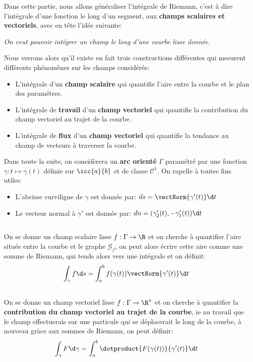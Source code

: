 Dans cette partie, nous allons généraliser l'intégrale de Riemann, c'est à dire l'intégrale d'une fonction le long d'un segment, aux \textbf{champs scalaires et vectoriels}, avec en tête l'idée suivante:
\begin{center}
   \textit{On veut pouvoir intégrer un champ le long d'une courbe lisse donnée.}
\end{center}
Nous verrons alors qu'il existe en fait trois constructions différentes qui mesurent différents phénomênes sur les champs considérés:
\begin{itemize}
   \item L'intégrale d'un \textbf{champ scalaire} qui quantifie l'aire entre la courbe et le plan des paramétres.
   \item L'intégrale de \textbf{travail} d'un \textbf{champ vectoriel} qui quantifie la contribution du champ vectoriel au trajet de la courbe.
   \item L'intégrale de \textbf{flux} d'un \textbf{champ vectoriel} qui quantifie la tendance au champ de vecteurs à traverser la courbe.
\end{itemize}
Dans toute la suite, on considèrera un \textbf{arc orienté} \(\Gamma\) paramétré par une fonction \(\gamma : t \mapsto \gamma(t)\) définie sur \(\icc{a}{b}\) et de classe \(\mathcal{C}^1\). On rapelle à toutes fins utiles:
\begin{itemize}
   \item L'abcisse curviligne de \(\gamma\) est donnée par: \(ds = \vectNorm{\gamma'(t)} \d t  \)
   \item Le vecteur normal à \(\gamma'\) est donnée par: \(dn = (\gamma_2'(t), -\gamma_1'(t))\d t  \)
\end{itemize}
\subsection*{}
On se donne un champ scalaire lisse \(f : \Gamma \rightarrow \R\) et on cherche à quantifier l'aire située entre la courbe et le graphe \(\mathscr{G}_f\), on peut alors écrire cette aire comme une somme de Riemann, qui tends alors vers une intégrale et on définit:
\[
   \int_{\gamma} f \d s = \int_{a}^{b}f(\gamma(t))\vectNorm{\gamma'(t)}\d t
\]
\subsection*{}
On se donne un champ vectoriel lisse \(f : \Gamma \rightarrow \R^n\) et on cherche à quantifier la \textbf{contribution du champ vectoriel au trajet de la courbe}, ie au travail que le champ effectuerais sur une particule qui se déplacerait le long de la courbe, à nouveau gràce aux sommes de Riemann, on peut définir:
\[
   \int_{\gamma} F \d \gamma = \int_{a}^{b} \dotproduct{F(\gamma(t))}{\gamma'(t)}\d t
\]
